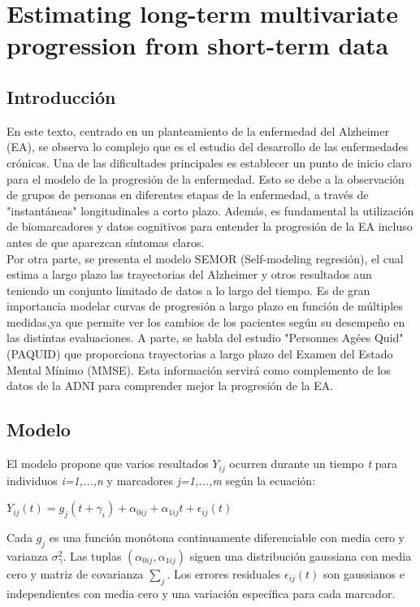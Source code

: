 \documentclass[12pt]{article}
\begin{document}
\section{Estimating long-term multivariate progression from short-term data}


\subsection{Introducción}
En este texto, centrado en un planteamiento de la enfermedad del Alzheimer (EA), se observa lo complejo que es el estudio del desarrollo de las enfermedades crónicas. Una de las dificultades principales es establecer un punto de inicio claro para el modelo de la progresión de la enfermedad. Esto se debe a la observación de grupos de personas en diferentes etapas de la enfermedad,  a través de "instantáneas" longitudinales a corto plazo. Además, es fundamental la utilización de biomarcadores y datos cognitivos para entender la progresión de la EA incluso antes de que aparezcan síntomas claros.\\

Por otra parte, se presenta el modelo SEMOR (Self-modeling regresión), el cual estima a largo plazo las trayectorias del Alzheimer y otros resultados aun teniendo un conjunto limitado de datos a lo largo del tiempo. Es de gran importancia modelar curvas de progresión a largo plazo en función de múltiples medidas,ya que permite ver los cambios de los pacientes según su desempeño en las distintas evaluaciones. A parte, se habla del estudio "Personnes Agées Quid" (PAQUID) que proporciona trayectorias a largo plazo del Examen del Estado Mental Mínimo (MMSE). Esta información servirá como complemento de los datos de la ADNI para comprender mejor la progresión de la EA.

\subsection{Modelo}
El modelo propone que varios resultados $Y_{ij}$ ocurren durante un tiempo \textit{t} para individuos \textit{i=1,...,n} y marcadores \textit{j=1,...,m} según la ecuación:
\begin{center}
	$Y_{ij}(t)=g_{j}(t+\gamma_{i})+\alpha_{0ij}+\alpha_{1ij}t+\epsilon_{ij}(t)$
\end{center}

Cada $g_{j}$ es una función monótona continuamente diferenciable con media cero y varianza $\sigma_{\gamma}^{2}$. Las tuplas $(\alpha_{0ij},\alpha_{1ij})$ siguen una distribución gaussiana con media cero y matriz de covarianza $\sum_{j}$. Los errores residuales $\epsilon_{ij}(t)$ son gaussianos e independientes con media cero y una variación específica para cada marcador.
\end{document}
